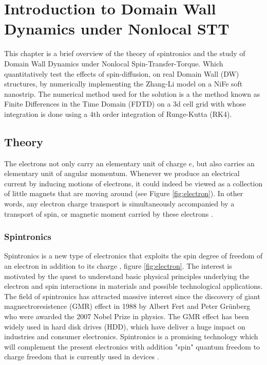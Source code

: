 
\chapter{Introduction to Domain Wall Dynamics under Nonlocal STT} %

\label{Introduction to Domain Wall Dynamics under Nonlocal STT} %



This chapter is a brief overview of the theory of spintronics and the study of Domain Wall Dynamics under Nonlocal Spin-Transfer-Torque. Which quantitatively test the effects of spin-diffusion, on real Domain Wall (DW) structures, by numerically implementing the Zhang-Li model on a NiFe soft nanostrip. The numerical method used for the solution is a the method known as Finite Differences in the Time Domain (FDTD) on a 3d cell grid with whose integration is done using a 4th order integration of Runge-Kutta (RK4).

\section{Theory}

 The electrons not only carry an elementary
unit of charge $e$, but also carries an elementary unit of angular momentum. Whenever we produce an electrical current by inducing
motions of electrons, it could indeed be viewed as a collection of little magnets that are moving around (see Figure \ref{fig:electron}). In other words, any electron charge transport is simultaneously accompanied by a transport of spin, or magnetic moment carried by these electrons \cite{cornell}.

\subsection{Spintronics}

Spintronics is a new type of electronics that exploits the spin degree of freedom of an electron in addition to its charge \cite{spinz},  figure \ref{fig:electron}. The interest is motivated by the quest to understand basic physical principles underlying the electron and spin interactions in materials and possible technological applications. The field of spintronics has attracted massive interest since the discovery of giant magnectroresistence (GMR) effect in 1988 by Albert Fert and Peter Gr\"{u}nberg who were awarded the 2007 Nobel Prize in physics. The GMR effect has been widely used in hard disk drives (HDD), which have deliver a huge impact on industries and consumer electronics. Spintronics is a promising technology which will complement the present electronics with addition "spin" quantum freedom to charge freedom that is currently used in devices \cite{nonlocalspin}.

